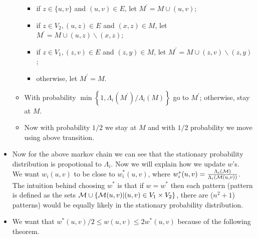 \begin{itemize}
\begin{flushleft}
\begin{itemize}
\begin{itemize}
		
		\item if $z \in\{u, v\}$ and $(u, v) \in E$, let $M^{\prime}=M \cup(u, v)$;
		\item if $z \in V_2,(u, z) \in E$ and $(x, z) \in M$, let $M^{\prime}=M \cup(u, z) \backslash(x, z)$;
		\item if $z \in V_1,(z, v) \in E$ and $(z, y) \in M$, let $M^{\prime}=M \cup(z, v) \backslash(z, y)$;
		\item otherwise, let $M^{\prime}=M$.
	\end{itemize}
		\item With probability $\min \left\{1, \Lambda_i\left(M^{\prime}\right) / \Lambda_i(M)\right\}$ go to $M^{\prime}$; otherwise, stay at $M$.
		\item Now with probability $1/2$ we stay at $M$ and with $1/2$ probability we move using above transition.
	
	\end{itemize}
\end{flushleft}
\item \begin{flushleft}
	Now for the above markov chain we can see that the stationary probability distribution is propotional to $\Lambda_i$. Now we will explain how we update $w$'s.\\
	We want $w_i(u,v)$ to be close to $w_i^*(u,v)$, where $w^*_i(u,v) = \frac{\Lambda_i(\mathcal{M})}{\Lambda_i(\mathcal{M}(u,v))}$. The intuition behind choosing $w^*$ is that if $w=w^*$ then each pattern (pattern is defined as the sets $\mathcal{M}\cup \{\mathcal{M}(u,v)| (u,v)\in V_1 \times V_2\}$, there are ($n^2+1$) patterns) would be equally likely in the stationary probability distribution.
\end{flushleft}
\item We want that $w^*(u,v)/2 \leq w(u,v) \leq 2w^*(u,v)$ because of the following theorem.



\end{itemize}
